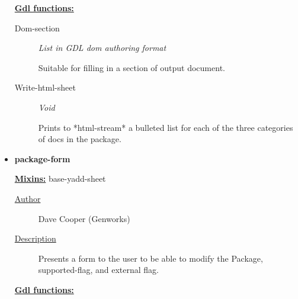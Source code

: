 \documentclass [11pt]{book}
\begin{document}
\begin{itemize}
\begin{description}
\end{description}






\textbf{
\underline{Gdl functions:}}

\begin{description}

\item [Dom-section]
\emph{List in GDL dom authoring format}

 Suitable for filling in a section of output document.




\item [Write-html-sheet]
\emph{Void}

 Prints to *html-stream* a bulleted list for each of the three categories of docs in the package.




\end{description}







\item {}
\label{prim:package-form}
\textbf{package-form}


\textbf{
\underline{Mixins:}} base-yadd-sheet





\begin{description}

\item [
\underline{Author}]


Dave Cooper (Genworks)



\item [
\underline{Description}]


Presents a form to the user to be able to modify the Package, 
supported-flag, and external flag.



\end{description}








\textbf{
\underline{Gdl functions:}}

\begin{description}


\end{description}
\end{itemize}
\end{document}
